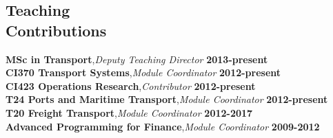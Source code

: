 \documentclass[margin]{res}
\begin{document}
\begin{resume}
\section{\sc Teaching\\ Contributions}
	{\bf MSc in Transport},\textit{Deputy Teaching Director} \hfill {\bf 2013-present}\\
	{\bf CI370 Transport Systems},\textit{Module Coordinator} \hfill {\bf 2012-present}\\
	{\bf CI423 Operations Research},\textit{Contributor} \hfill {\bf 2012-present}\\
	{\bf T24 Ports and Maritime Transport},\textit{Module Coordinator} \hfill {\bf 2012-present}\\
	{\bf T20 Freight Transport},\textit{Module Coordinator} \hfill {\bf 2012-2017}\\
	{\bf Advanced Programming for Finance},\textit{Module Coordinator} \hfill {\bf 2009-2012}\\

\vspace{-0.15in}

\end{resume}
\end{document}
